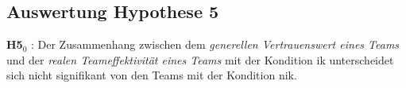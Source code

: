 \documentclass[a4paper,11pt]{article}%
\renewcommand{\\}{\vspace*{0.5\baselineskip} \newline}
\begin{document}
%

\newpage
	\subsection{Auswertung Hypothese 5}





\textbf{H5$_{0}$} : Der Zusammenhang zwischen dem \textit{generellen Vertrauenswert eines Teams} und der \textit{realen Teameffektivität eines Teams} mit der Kondition \ac{ik} unterscheidet sich nicht signifikant von den Teams mit der Kondition \ac{nik}. \\
\end{document}
